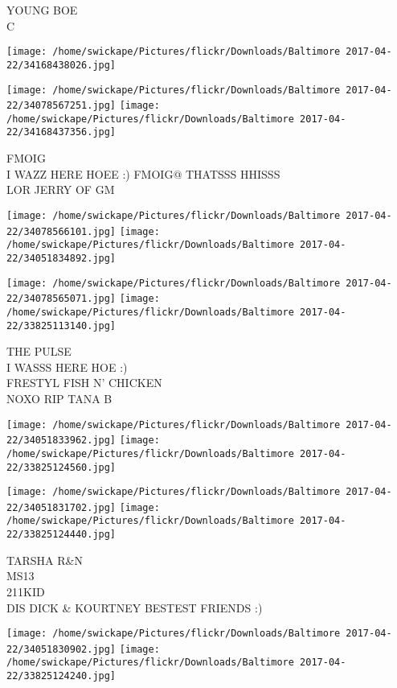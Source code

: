 \documentclass[10pt,letterpaper]{article}
\begin{document}
YOUNG BOE\\
C
\pagebreak

\texttt{[image: /home/swickape/Pictures/flickr/Downloads/Baltimore 2017-04-22/34168438026.jpg]}

\vspace{0.25in}
\texttt{[image: /home/swickape/Pictures/flickr/Downloads/Baltimore 2017-04-22/34078567251.jpg]}
\texttt{[image: /home/swickape/Pictures/flickr/Downloads/Baltimore 2017-04-22/34168437356.jpg]}

FMOIG\\
I WAZZ HERE HOEE :) FMOIG@ THATSSS HHISSS\\
LOR JERRY OF GM
\pagebreak

\texttt{[image: /home/swickape/Pictures/flickr/Downloads/Baltimore 2017-04-22/34078566101.jpg]}
\texttt{[image: /home/swickape/Pictures/flickr/Downloads/Baltimore 2017-04-22/34051834892.jpg]}

\texttt{[image: /home/swickape/Pictures/flickr/Downloads/Baltimore 2017-04-22/34078565071.jpg]}
\texttt{[image: /home/swickape/Pictures/flickr/Downloads/Baltimore 2017-04-22/33825113140.jpg]}

THE PULSE\\
I WASSS HERE HOE :)\\
FRESTYL FISH N' CHICKEN\\
NOXO RIP TANA B
\pagebreak

\texttt{[image: /home/swickape/Pictures/flickr/Downloads/Baltimore 2017-04-22/34051833962.jpg]}
\texttt{[image: /home/swickape/Pictures/flickr/Downloads/Baltimore 2017-04-22/33825124560.jpg]}

\texttt{[image: /home/swickape/Pictures/flickr/Downloads/Baltimore 2017-04-22/34051831702.jpg]}
\texttt{[image: /home/swickape/Pictures/flickr/Downloads/Baltimore 2017-04-22/33825124440.jpg]}

TARSHA R\&N\\
MS13\\
211KID\\
DIS DICK \& KOURTNEY BESTEST FRIENDS :)
\pagebreak

\texttt{[image: /home/swickape/Pictures/flickr/Downloads/Baltimore 2017-04-22/34051830902.jpg]}
\texttt{[image: /home/swickape/Pictures/flickr/Downloads/Baltimore 2017-04-22/33825124240.jpg]}
\end{document}
